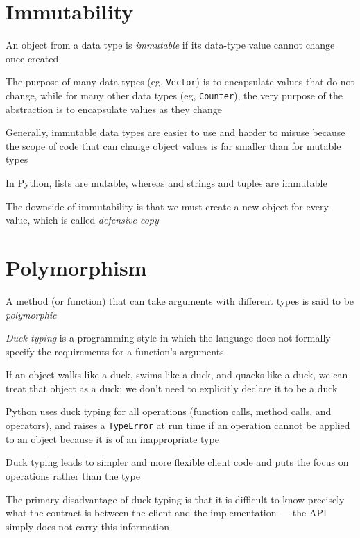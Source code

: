 \documentclass[8pt,a4paper,compress,handout]{beamer}
\begin{document}
\section{Immutability}
\begin{frame}[fragile]
An object from a data type is \emph{immutable} if its data-type value cannot change once created

\bigskip

The purpose of many data types (eg, \lstinline{Vector}) is to encapsulate values that do not change, while for many other data types (eg, \lstinline{Counter}), the very purpose of the abstraction is to encapsulate values as they change 

\bigskip

Generally, immutable data types are easier to use and harder to misuse because the scope of code that can change object values is far smaller than for mutable types

\bigskip

In Python, lists are mutable, whereas and strings and tuples are immutable

\bigskip

The downside of immutability is that we must create a new object for every value, which is called \emph{defensive copy}
\end{frame}

\section{Polymorphism}
\begin{frame}[fragile]
A method (or function) that can take arguments with different types is said to be \emph{polymorphic}

\bigskip

\emph{Duck typing} is a programming style in which the language does not formally specify the requirements for a function's arguments

\bigskip

If an object walks like a duck, swims like a duck, and quacks like a duck, we can treat that object as a duck; we don't need to explicitly declare it to be a duck

\bigskip

Python uses duck typing for all operations (function calls, method calls, and operators), and raises a \lstinline{TypeError} at run time if an operation cannot be applied to an object because it is of an inappropriate type

\bigskip

Duck typing leads to simpler and more flexible client code and puts the focus on operations rather than the type

\bigskip

The primary disadvantage of duck typing is that it is difficult to know precisely what the contract is between the client and the implementation --- the API simply does not carry this information
\end{frame}
\end{document}
